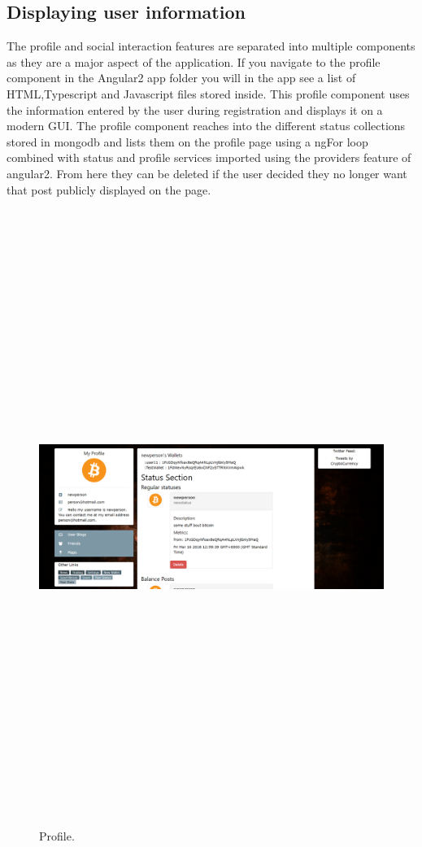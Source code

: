 \subsection{Displaying user information}
The profile and social interaction features are separated into multiple components as they are a major aspect of the application. If you navigate to the profile component in the Angular2 app folder you will  in the app see a list of HTML,Typescript and Javascript files stored inside. This profile component uses the information entered by the user during registration and displays it on a modern GUI. The profile component reaches into the different status collections stored in mongodb and lists them on the profile page using a ngFor loop combined with status and profile services imported using the providers feature of angular2. From here they can be deleted if the user decided they no longer want that post publicly displayed on the page.

\begin{figure}[H]
\centering
\includegraphics[width=17cm, height=20cm]{img/UserProfile.png}
\caption{Profile.}
\end{figure}

